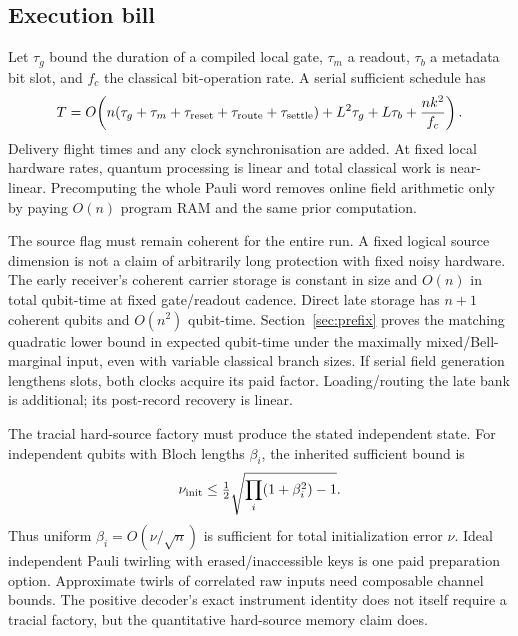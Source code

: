 \documentclass[11pt]{article}
\begin{document}
\subsection{Execution bill}
Let $\tau_g$ bound the duration of a compiled local gate, $\tau_m$ a readout,
$\tau_b$ a metadata bit slot, and $f_c$ the classical bit-operation rate. A
serial sufficient schedule has
\begin{equation}
 T=O\!\left(n(\tau_g+\tau_m+\tau_{\rm reset}+\tau_{\rm route}+\tau_{\rm settle})
       +L^2\tau_g+L\tau_b+\frac{nk^2}{f_c}\right). \label{eq:time}
\end{equation}
Delivery flight times and any clock synchronisation are added. At fixed local
hardware rates, quantum processing is linear and total classical work is
near-linear. Precomputing the whole Pauli word removes online field arithmetic
only by paying $O(n)$ program RAM and the same prior computation.

The source flag must remain coherent for the entire run. A fixed logical source
dimension is not a claim of arbitrarily long protection with fixed noisy hardware.
The early receiver's coherent carrier storage is constant in size and $O(n)$
in total qubit-time at fixed gate/readout cadence. Direct late storage has
$n+1$ coherent qubits and $O(n^2)$ qubit-time. Section~\ref{sec:prefix} proves
the matching quadratic lower bound in expected qubit-time under the maximally
mixed/Bell-marginal input, even with variable classical branch sizes. If serial
field generation lengthens slots, both clocks acquire its paid factor.
Loading/routing the late bank is additional; its post-record recovery is linear.

The tracial hard-source factory must produce the stated independent state. For
independent qubits with Bloch lengths $\beta_i$, the inherited sufficient bound is
\begin{equation}
 \nu_{\rm init}\le\tfrac12\sqrt{\prod_i(1+\beta_i^2)-1}.
\end{equation}
Thus uniform $\beta_i=O(\nu/\sqrt n)$ is sufficient for total initialization
error $\nu$. Ideal independent Pauli twirling with erased/inaccessible keys is
one paid preparation option. Approximate twirls of correlated raw inputs need
composable channel bounds. The positive decoder's exact instrument identity
does not itself require a tracial factory, but the quantitative hard-source
memory claim does.
\end{document}
